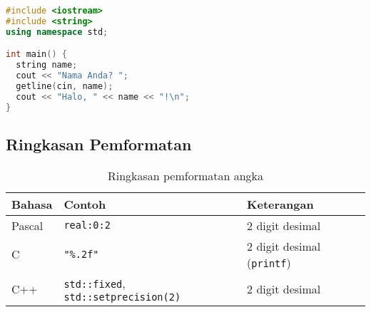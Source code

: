 \documentclass[../main.tex]{subfiles}
\begin{document}
\begin{lstlisting}[language=C++, caption={Input nama pada C++}]
#include <iostream>
#include <string>
using namespace std;

int main() {
  string name;
  cout << "Nama Anda? ";
  getline(cin, name);
  cout << "Halo, " << name << "!\n";
}
\end{lstlisting}

\subsection{Ringkasan Pemformatan}
\begin{table}[H]
  \centering
  \caption{Ringkasan pemformatan angka}
  \begin{tabular}{@{}lll@{}}
    \toprule
    Bahasa & Contoh & Keterangan \\
    \midrule
    Pascal & \texttt{real:0:2} & 2 digit desimal \\
    C & \texttt{"\%.2f"} & 2 digit desimal (\texttt{printf}) \\
    C++ & \texttt{std::fixed}, \texttt{std::setprecision(2)} & 2 digit desimal \\
    \bottomrule
  \end{tabular}
  \\\parencite{w3pascal-io,gnu-c-manual,cpp-iomanip}
\end{table}
\end{document}
